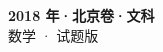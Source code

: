 \documentclass[zihao=-4, a4paper]{ctexart}
\begin{document}
\begin{center}
  {\Large\bfseries 2018 年·北京卷·文科}\\[4pt]
  {\large 数学 · 试题版}
\end{center}
\medskip
{}

\end{document}
